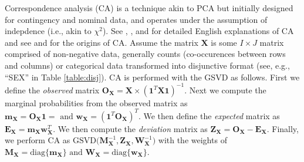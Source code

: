 \documentclass[12pt]{article}
\begin{document}
Correspondence analysis (CA) is a technique akin to PCA but initially
designed for contingency and nominal data, and operates under the
assumption of indepdence (i.e., akin to \(\chi^2\)). See
\citet{greenacre_theory_1984}, \citet{greenacre_correspondence_2010-1},
and \citet{lebart_multivariate_1984} for detailed English explanations
of CA and see \citet{escofier-cordier_analyse_1965} and
\citet{benzecri_analyse_1973} for the origins of CA. Assume the matrix
\({\mathbf X}\) is some \(I \times J\) matrix comprised of non-negative
data, generally counts (co-occurences between rows and columns) or
categorical data transformed into disjunctive format (see, e.g., ``SEX''
in Table \ref{table:disj}). CA is performed with the GSVD as follows.
First we define the \emph{observed} matrix
\({\mathbf O}_{\mathbf X} = {\mathbf X} \times ({\mathbf 1}^{T}{\mathbf X} {\mathbf 1})^{-1}\).
Next we compute the marginal probabilities from the observed matrix as
\({\mathbf m}_{\mathbf X} = {\mathbf O}_{\mathbf X}{\mathbf 1} = \text{ and } {\mathbf w}_{\mathbf X} = ({\mathbf 1}^{T}{\mathbf O}_{\mathbf X})^{T}\).
We then define the \emph{expected} matrix as
\({\mathbf E}_{\mathbf X} = {\mathbf m}_{\mathbf X}{\mathbf w}_{\mathbf X}^{T}\).
We then compute the \emph{deviation} matrix as
\({\mathbf Z}_{\mathbf X} = {\mathbf O}_{\mathbf X} - {\mathbf E}_{\mathbf X}\).
Finally, we perform CA as
\(\mathrm{GSVD(} {\mathbf M}_{\mathbf X}^{-1}, {\mathbf Z}_{\mathbf X}, {\mathbf W}_{\mathbf X}^{-1} \mathrm{)}\)
with the weights of
\({\mathbf M}_{\mathbf X} = \mathrm{diag\{} {\mathbf m}_{\mathbf X} \mathrm{\}} \text{ and } {\mathbf W}_{\mathbf X} = \mathrm{diag\{} {\mathbf w}_{\mathbf X} \mathrm{\}}\).
\end{document}
